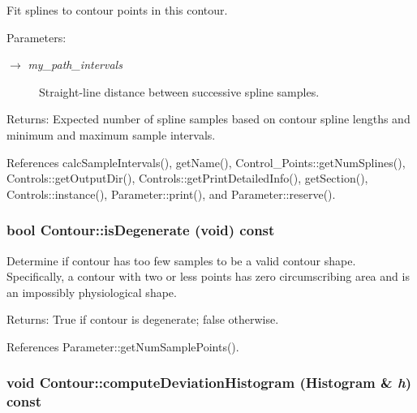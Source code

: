 Fit splines to contour points in this contour. \begin{Desc}
\item[Parameters:]
\begin{description}
\item[\mbox{$\rightarrow$} {\em my\_\-path\_\-intervals}]Straight-line distance between successive spline samples. \end{description}
\end{Desc}
\begin{Desc}
\item[Returns:]Expected number of spline samples based on contour spline lengths and minimum and maximum sample intervals. \end{Desc}


References calcSampleIntervals(), getName(), Control\_\-Points::getNumSplines(), Controls::getOutputDir(), Controls::getPrintDetailedInfo(), getSection(), Controls::instance(), Parameter::print(), and Parameter::reserve().\hypertarget{classContour_efb2ebf2825a536726a22810e814d493}{
\subsubsection[isDegenerate]{\setlength{\rightskip}{0pt plus 5cm}bool Contour::isDegenerate (void) const}}
\label{classContour_efb2ebf2825a536726a22810e814d493}


Determine if contour has too few samples to be a valid contour shape. Specifically, a contour with two or less points has zero circumscribing area and is an impossibly physiological shape. \begin{Desc}
\item[Returns:]True if contour is degenerate; false otherwise. \end{Desc}


References Parameter::getNumSamplePoints().\hypertarget{classContour_bed58a39b4082fb527aaf9c50f7f31f0}{
\subsubsection[computeDeviationHistogram]{\setlength{\rightskip}{0pt plus 5cm}void Contour::computeDeviationHistogram ({\bf Histogram} \& {\em h}) const}}
\label{classContour_bed58a39b4082fb527aaf9c50f7f31f0}



